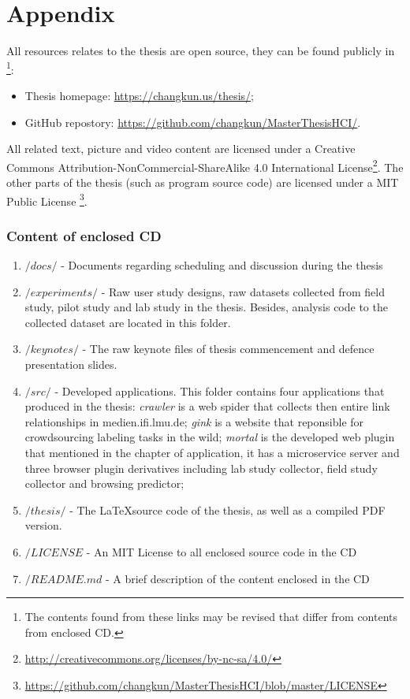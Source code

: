 \part*{Appendix}
\appendix
{}
\fancyhead[LE,RO,LO,RE]{} %

All resources relates to the thesis are open source, 
they can be found publicly in \footnote{The contents found from these links may be revised that differ from contents from enclosed CD.}:

\begin{itemize}
    \item Thesis homepage: \url{https://changkun.us/thesis/};
    \item GitHub repostory: \url{https://github.com/changkun/MasterThesisHCI/}.
\end{itemize}

All related text, picture and video content are licensed under a 
Creative Commons Attribution-NonCommercial-ShareAlike 4.0 International 
License\footnote{\url{http://creativecommons.org/licenses/by-nc-sa/4.0/}}.
The other parts of the thesis (such as program source code) are licensed 
under a MIT Public License
\footnote{\url{https://github.com/changkun/MasterThesisHCI/blob/master/LICENSE}}.

\section{Content of enclosed CD}
\label{appendix:a}

\begin{enumerate}
    \item $/docs/$ - Documents regarding scheduling and discussion during the thesis
    \item $/experiments/$ - Raw user study designs, raw datasets collected from field study, pilot study and lab study in the thesis. Besides, analysis code to the collected dataset are located in this folder.
    \item $/keynotes/$ - The raw keynote files of thesis commencement and 
                        defence presentation slides.
    \item $/src/$ - Developed applications. This folder contains four applications that produced in the thesis: \emph{crawler} is a web spider that collects then entire link
    relationships in medien.ifi.lmu.de; \emph{gink} is a website that reponsible for 
    crowdsourcing labeling tasks in the wild; \emph{mortal} is the developed web plugin 
    that mentioned in the chapter of application, it has a microservice server and three browser plugin derivatives including lab study collector, field study collector and browsing predictor;
    \item $/thesis/$ - The \LaTeX source code of the thesis, as well as a compiled PDF version.
    \item $/LICENSE$ - An MIT License to all enclosed source code in the CD
    \item $/README.md$ - A brief description of the content enclosed in the CD
\end{enumerate}


